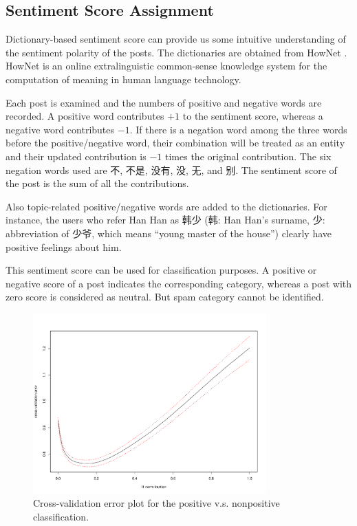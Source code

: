 \documentclass[11pt]{article}
\newcommand{\1}[1]{{\mathbf 1}\left\{#1\right\}}        %
\begin{document}
\subsection{Sentiment Score Assignment}\label{subsec:senscore}
Dictionary-based sentiment score can provide us some intuitive understanding of the sentiment polarity of the posts. 
The dictionaries are obtained from HowNet \cite{HowNet}. HowNet is an online extralinguistic common-sense knowledge system for the computation of meaning in human language technology.


Each post is examined and the numbers of positive and negative words are recorded. A positive word contributes $+1$ to the sentiment score, whereas a negative word contributes $-1$. If there is a negation word among the three words before the positive/negative word, their combination will be treated as an entity and their updated contribution is $-1$ times the original contribution. The six negation words used are 不, 不是, 没有, 没, 无, and 别. The sentiment score of the post is the sum of all the contributions. 

Also topic-related positive/negative words are added to the dictionaries. For instance, the users who refer Han Han as 韩少 (韩: Han Han's surname, 少: abbreviation of 少爷, which means ``young master of the house'') clearly have positive feelings about him. 


This sentiment score can be used for classification purposes. A positive or negative score of a post indicates the corresponding category, whereas a post with zero score is considered as neutral. But spam category cannot be identified. 

  

\begin{center}
\begin{figure}[tb]
   \centering
   \includegraphics[width=0.8\textwidth]{../lassoResults/CVPosErr.pdf} 
      \caption{Cross-validation error plot for the positive v.s. nonpositive classification. }
   \label{fig:cvplotpos}
\end{figure}
\end{center}
\end{document}
